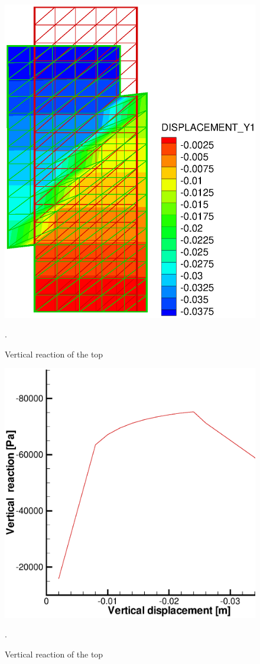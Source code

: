 \begin{figure}[H]
\begin{center}
\includegraphics[scale=0.35]{M/m_sdc.eps}
\end{center}
\caption{Vertical reaction of the top}.
 \label{fig:loc}
\end{figure}
\begin{figure}[H]
\begin{center}
\includegraphics[scale=0.35]{M/m_sdc_s_u.eps}
\end{center}
\caption{Vertical reaction of the top}.
 \label{fig:vreact}
\end{figure}

